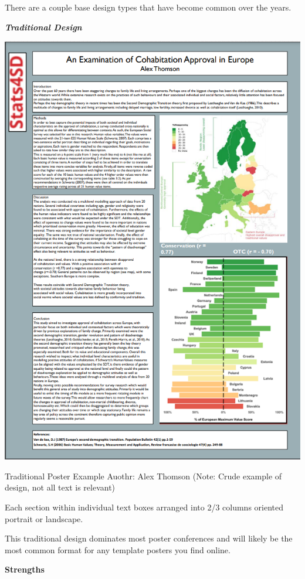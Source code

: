 \documentclass[
  titlepage]{book}
\begin{document}
There are a couple base design types that have become common over the years.

\textbf{\emph{Traditional Design}}

\begin{center}\includegraphics[width=9.6in]{img/trad example 1} \end{center}

Traditional Poster Example Auothr: Alex Thomson (Note: Crude example of design, not all text is relevant)

Each section within individual text boxes arranged into 2/3 columns oriented portrait or landscape.

This traditional design dominates most poster conferences and will likely be the most common format for any template posters you find online.

\textbf{Strengths}
\end{document}
